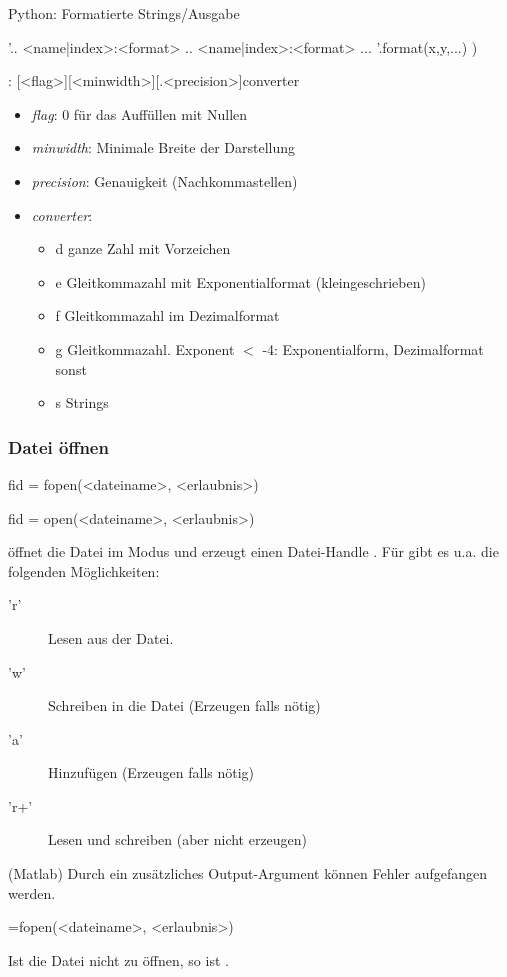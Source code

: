 \documentclass[hyperref={xetex}]{beamer}
\begin{document}
%
%
%
\begin{frame}[fragile]{Python: Formatierte Strings/Ausgabe}
  \begin{pyin}
'.. {<name|index>:<format>} .. {<name|index>:<format>} ... '.format(x,y,...) )
  \end{pyin}

  : [<flag>][<minwidth>][.<precision>]converter
  \begin{itemize}
    \item \emph{flag}: 0 für das Auffüllen mit Nullen
    \item \emph{minwidth}: Minimale Breite der Darstellung
    \item \emph{precision}: Genauigkeit (Nachkommastellen)
    \item \emph{converter}:
    \begin{itemize}
      \item \alert{d}   ganze Zahl mit Vorzeichen 
      \item \alert{e}  Gleitkommazahl mit Exponentialformat (kleingeschrieben) 
      \item \alert{f}   Gleitkommazahl im Dezimalformat 
      \item \alert{g}   Gleitkommazahl. Exponent $<$ -4: Exponentialform, Dezimalformat sonst
      \item \alert{s}   Strings  
    \end{itemize}
  \end{itemize}

\end{frame}
%
%
\begin{frame}[fragile]\frametitle{Datei öffnen}
\begin{matlabin}
fid = fopen(<dateiname>, <erlaubnis>)
\end{matlabin}
\begin{pyin}
fid = open(<dateiname>, <erlaubnis>)  
\end{pyin}

 öffnet die Datei  im Modus
   und erzeugt einen
  Datei-Handle . Für  gibt es u.a. die folgenden
  Möglichkeiten:
\begin{description}
\item ['r']  Lesen aus der Datei.
\item ['w']  Schreiben in die Datei (Erzeugen falls nötig)
\item ['a']  Hinzufügen (Erzeugen falls nötig)
\item ['r+'] Lesen und schreiben (aber nicht erzeugen) 
\end{description}
(Matlab) Durch ein  zusätzliches Output-Argument können Fehler aufgefangen
  werden. 
\begin{matlabin}
=fopen(<dateiname>, <erlaubnis>)
\end{matlabin}
Ist  die Datei nicht zu öffnen, so ist . 
\end{frame}
\end{document}
